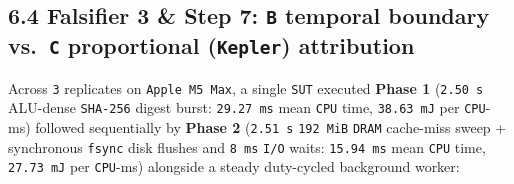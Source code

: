 \documentclass[10pt,letterpaper]{article}
\begin{document}
\subsection{\texorpdfstring{6.4 Falsifier 3 \& Step 7: \texttt{B}
temporal boundary vs.~\texttt{C} proportional (\texttt{Kepler})
attribution}{6.4 Falsifier 3 \& Step 7: B temporal boundary vs.~C proportional (Kepler) attribution}}\label{falsifier-3-step-7-b-temporal-boundary-vs.-c-proportional-kepler-attribution}

Across \texttt{3} replicates on \texttt{Apple\ M5\ Max}, a single
\texttt{SUT} executed \textbf{Phase 1} (\texttt{2.50\ s} ALU-dense
\texttt{SHA-256} digest burst: \texttt{29.27\ ms} mean \texttt{CPU}
time, \texttt{38.63\ mJ} per \texttt{CPU}-ms) followed sequentially by
\textbf{Phase 2} (\texttt{2.51\ s} \texttt{192\ MiB} \texttt{DRAM}
cache-miss sweep + synchronous \texttt{fsync} disk flushes and
\texttt{8\ ms} \texttt{I/O} waits: \texttt{15.94\ ms} mean \texttt{CPU}
time, \texttt{27.73\ mJ} per \texttt{CPU}-ms) alongside a steady
duty-cycled background worker:
\end{document}
